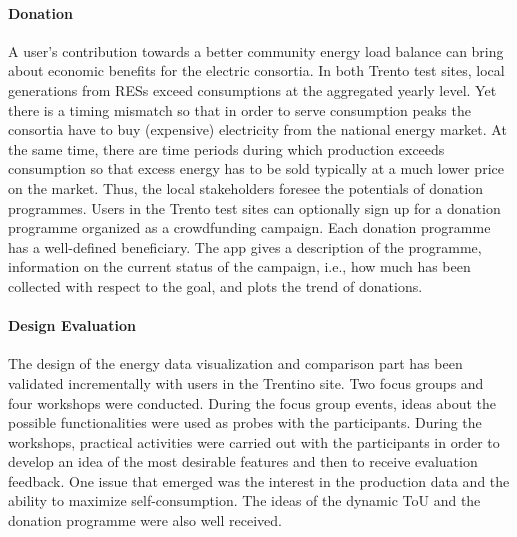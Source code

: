 \paragraph{Donation}
A user's contribution towards a better community energy load balance can bring about economic benefits for the electric consortia. 
In both Trento test sites, local generations from RESs exceed consumptions at the aggregated yearly level. Yet there is a timing mismatch so that in order to serve consumption peaks the consortia have to buy (expensive) electricity from the national energy market. At the same time, there are time periods during which production exceeds consumption so that excess energy has to be sold typically at a much lower price on the market.
% 
Thus, the local stakeholders foresee the potentials of donation programmes. 
Users in the Trento test sites can optionally sign up for a donation programme organized as a crowdfunding campaign. 
Each donation programme has a well-defined beneficiary. The app gives a description of the programme, information on the current status of the campaign, i.e., how much has been collected with respect to the goal, and plots the trend of donations.



\paragraph{Design Evaluation}
The design of the energy data visualization and comparison part has been validated incrementally with users in the Trentino site. Two focus groups and four workshops were conducted. During the focus group events, ideas about the possible functionalities were used as probes with the participants. During the workshops, practical activities were carried out with the participants in order to develop an idea of the most desirable features and then to receive evaluation feedback.
% 
One issue that emerged was the interest in the production data and the ability to maximize self-consumption. The ideas of the dynamic ToU and the donation programme were also well received. 

